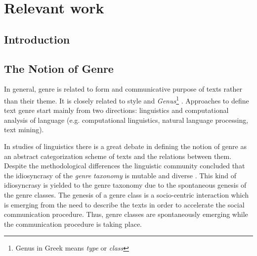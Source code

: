 
\chapter{Relevant work}

\label{chap:relevant_work}


\newcommand{\keyword}[1]{\textbf{#1}}
\newcommand{\tabhead}[1]{\textbf{#1}}
\newcommand{\code}[1]{\texttt{#1}}
\newcommand{\file}[1]{\texttt{\bfseries#1}}
\newcommand{\option}[1]{\texttt{\itshape#1}}


\section{Introduction}\label{chap:relevant_work:sec:intro}

\section{The Notion of Genre}
\label{chap:relevant_work:sec:definitions}

In general, genre is related to form and communicative purpose of texts rather than their theme. It is closely related to style and \textit{Genus}\footnote{Genus in Greek means \textit{type} or \textit{class}} \parencite{sugiyanto2014term}. Approaches to define text genre start mainly from two directions: linguistics and computational analysis of language (e.g. computational linguistics, natural language processing, text mining). 

In studies of linguistics there is a great debate in defining the notion of genre as an abstract categorization scheme of texts and the relations between them. Despite the methodological differences the linguistic community concluded that the idiosyncrasy of the \textit{genre taxonomy} is mutable and diverse \parencite{coutinho2009describe}. This kind of idiosyncrasy is yielded to the genre taxonomy due to the spontaneous genesis of the genre classes. The genesis of a genre class is a socio-centric interaction which is emerging from the need to describe the texts in order to accelerate the social communication procedure. Thus, genre classes are spontaneously emerging while the communication procedure is taking place.

